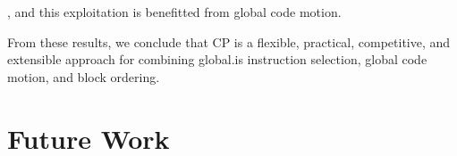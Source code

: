 , and this exploitation is benefitted from
\gls{global code motion}.

From these results, we conclude that \glsdesc{CP} is a flexible, practical,
competitive, and extensible approach for combining \gls{global.is}
\gls{instruction selection}, \gls{global code motion}, and \gls{block ordering}.


\section{Future Work}


